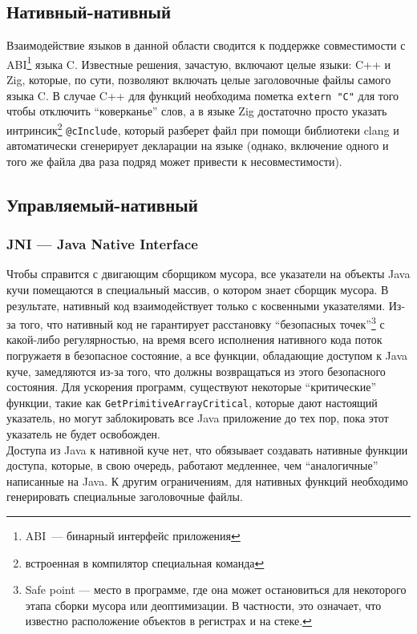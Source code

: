 \documentclass[times,specification,annotation]{itmo-student-thesis}
\begin{document}
\subsection{Нативный-нативный}
Взаимодействие языков в данной области сводится к поддержке совместимости с ABI\footnote{ABI~--- бинарный интерфейс приложения} языка C. Известные решения, зачастую, включают целые языки: C++ и Zig, которые, по сути, позволяют включать целые заголовочные файлы самого языка C. В случае C++ для функций необходима пометка \texttt{extern "C"} для того чтобы отключить ``коверканье'' слов, а в языке Zig достаточно просто указать интринсик\footnote{встроенная в компилятор специальная команда} \texttt{@cInclude}, который разберет файл при помощи библиотеки clang и автоматически сгенерирует декларации на языке (однако, включение одного и того же файла два раза подряд может привести к несовместимости).

\subsection{Управляемый-нативный}
\subsubsection{JNI --- Java Native Interface}
Чтобы справится с двигающим сборщиком мусора, все указатели на объекты Java кучи помещаются в специальный массив, о котором знает сборщик мусора. В результате, нативный код взаимодействует только с косвенными указателями. Из-за того, что нативный код не гарантирует расстановку ``безопасных точек''\footnote{Safe point --- место в программе, где она может остановиться для некоторого этапа сборки мусора или деоптимизации. В частности, это означает, что известно расположение объектов в регистрах и на стеке.} с какой-либо регулярностью, на время всего исполнения нативного кода поток погружаетя в безопасное состояние, а все функции, обладающие доступом к Java куче, замедляются из-за того, что должны возвращаться из этого безопасного состояния. Для ускорения программ, существуют некоторые ``критические'' функции, такие как \texttt{GetPrimitiveArrayCritical}, которые дают настоящий указатель, но могут заблокировать все Java приложение до тех пор, пока этот указатель не будет освобожден.\\
Доступа из Java к нативной куче нет, что обязывает создавать нативные функции доступа, которые, в свою очередь, работают медленнее, чем ``аналогичные'' написанные на Java. К другим ограничениям, для нативных функций необходимо генерировать специальные заголовочные файлы.\\
\end{document}
